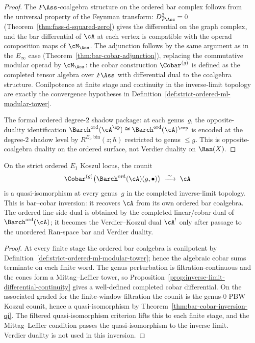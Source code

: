 \begin{proof}
The $F\!\Ass$-coalgebra structure on the ordered bar complex
follows from the universal property of the Feynman transform:
$D_{F\!\Ass}^2 = 0$
(Theorem~\ref{thm:fass-d-squared-zero}) gives the differential
on the graph complex, and the bar differential of $\cA$ at each
vertex is compatible with the operad composition maps of
$\cM_\Ass$. The adjunction follows by the same argument as in
the $E_\infty$ case
(Theorem~\ref{thm:bar-cobar-adjunction}),
replacing the commutative modular operad by $\cM_\Ass$:
the cobar construction $\Cobar^{(g)}$ is defined as the completed
tensor algebra over $F\!\Ass$ with differential dual to the coalgebra
structure. Conilpotence at finite stage and continuity in the
inverse-limit topology are exactly the convergence hypotheses in
Definition~\ref{def:strict-ordered-ml-modular-tower}.

The formal ordered degree-$2$ shadow package: at each genus~$g$, the
opposite-duality identification
${\Barch}^{\mathrm{ord}}(\cA^{\op}) \cong
{\Barch}^{\mathrm{ord}}(\cA)^{\cop}$
is encoded at the degree-$2$ shadow level by
$R^{E_1,\mathrm{bin}}(z;\hbar)$ restricted to genus
$\leq g$. This is opposite-coalgebra duality on the ordered surface,
not Verdier duality on $\Ran(X)$.
\end{proof}

\begin{theorem}
\label{thm:e1-theorem-B-modular}
On the strict ordered $E_1$ Koszul locus, the counit
\[
\Cobar^{(g)}\bigl({\Barch}^{\mathrm{ord}}(\cA)(g,\bullet)\bigr)
\;\xrightarrow{\;\sim\;}\;
\cA
\]
is a quasi-isomorphism at every genus~$g$ in the completed
inverse-limit topology. This is bar--cobar inversion: it recovers
$\cA$ from its own ordered bar coalgebra. The ordered line-side dual
is obtained by the completed linear/cobar dual of
${\Barch}^{\mathrm{ord}}(\cA)$; it becomes the Verdier--Koszul dual
$\cA^!$ only after passage to the unordered Ran-space bar and Verdier
duality.
\end{theorem}

\begin{proof}
At every finite stage the ordered bar coalgebra is conilpotent by
Definition~\ref{def:strict-ordered-ml-modular-tower}; hence the
algebraic cobar sums terminate on each finite word. The genus
perturbation is filtration-continuous and the cones form a
Mittag--Leffler tower, so
Proposition~\ref{prop:inverse-limit-differential-continuity} gives a
well-defined completed cobar differential. On the associated graded
for the finite-window filtration the counit is the genus-$0$ PBW
Koszul counit, hence a quasi-isomorphism by
Theorem~\ref{thm:bar-cobar-inversion-qi}. The filtered
quasi-isomorphism criterion lifts this to each finite stage, and the
Mittag--Leffler condition passes the quasi-isomorphism to the inverse
limit. Verdier duality is not used in this inversion.
\end{proof}

